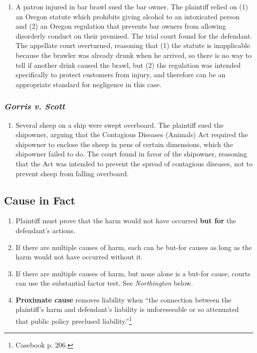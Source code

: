 \begin{enumerate}
    \item A patron injured in bar brawl sued the bar owner. The plaintiff relied on (1) an Oregon statute which prohibits giving alcohol to an intoxicated person and (2) an Oregon regulation that prevents bar owners from allowing disorderly conduct on their premised. The trial court found for the defendant. The appellate court overturned, reasoning that (1) the statute is inapplicable because the brawler was already drunk when he arrived, so there is no way to tell if another drink caused the brawl, but (2) the regulation was intended specifically to protect customers from injury, and therefore can be an appropriate standard for negligence in this case.
\end{enumerate}

\subsubsection{\emph{Gorris v. Scott}}

\begin{enumerate}
    \item Several sheep on a ship were swept overboard. The plaintiff sued the shipowner, arguing that the Contagious Diseases (Animals) Act required the shipowner to enclose the sheep in pens of certain dimensions, which the shipowner failed to do. The court found in favor of the shipowner, reasoning that the Act was intended to prevent the spread of contagious diseases, not to prevent sheep from falling overboard.
\end{enumerate}

\subsection{Cause in Fact}

\begin{enumerate}
    \item Plaintiff must prove that the harm would not have occurred \textbf{but for} the defendant's actions.
    \item If there are multiple causes of harm, each can be but-for causes as long as the harm would not have occurred without it.
    \item If there are multiple causes of harm, but none alone is a but-for cause, courts can use the substantial factor test. See \emph{Northington} below.
    \item \textbf{Proximate cause} removes liability when ``the connection between the plaintiff's harm and defendant's liability is unforeseeable or so attenuated that public policy preclused liability.''\footnote{Casebook p. 206.}
\end{enumerate}

